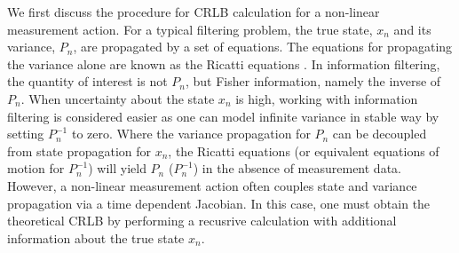 We first discuss the procedure for CRLB calculation for a non-linear measurement action. For a typical filtering problem,  the true state, $x_n$ and its variance, $P_n$, are propagated by a set of equations. The equations for propagating the variance alone are known as the Ricatti equations \cite{grewal2001theory}. In information filtering, the quantity of interest is not $P_n$, but Fisher information, namely the inverse of $P_n$. When uncertainty about the state $x_n$ is high, working with information filtering is considered easier as one can model infinite variance in stable way by setting $P_n^{-1}$ to zero. Where the variance propagation for $P_n$ can be decoupled from state propagation for $x_n$, the Ricatti equations (or equivalent equations of motion for $P_n^{-1}$) will yield $P_n$ ($P_n^{-1}$) in the absence of measurement data. However, a non-linear measurement action often couples state and variance propagation via a time dependent Jacobian. In this case, one must obtain the theoretical CRLB by performing a recusrive calculation with additional information about the true state $x_n$. 

